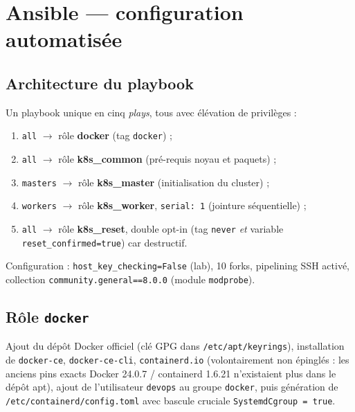 \documentclass[11pt,a4paper]{article}
\begin{document}
\section{Ansible --- configuration automatisée}

\subsection{Architecture du playbook}
Un playbook unique en cinq \emph{plays}, tous avec élévation de privilèges :

\begin{enumerate}[itemsep=1pt]
  \item \texttt{all} $\rightarrow$ rôle \textbf{docker} (tag \texttt{docker}) ;
  \item \texttt{all} $\rightarrow$ rôle \textbf{k8s\_common} (pré-requis noyau et paquets) ;
  \item \texttt{masters} $\rightarrow$ rôle \textbf{k8s\_master} (initialisation du cluster) ;
  \item \texttt{workers} $\rightarrow$ rôle \textbf{k8s\_worker}, \texttt{serial: 1} (jointure séquentielle) ;
  \item \texttt{all} $\rightarrow$ rôle \textbf{k8s\_reset}, double opt-in (tag \texttt{never} \emph{et} variable \texttt{reset\_confirmed=true}) car destructif.
\end{enumerate}

Configuration : \texttt{host\_key\_checking=False} (lab), 10 forks, pipelining SSH activé, collection \texttt{community.general==8.0.0} (module \texttt{modprobe}).

\subsection{Rôle \texttt{docker}}
Ajout du dépôt Docker officiel (clé GPG dans \texttt{/etc/apt/keyrings}), installation de \texttt{docker-ce}, \texttt{docker-ce-cli}, \texttt{containerd.io} (volontairement non épinglés : les anciens pins exacts Docker 24.0.7 / containerd 1.6.21 n'existaient plus dans le dépôt apt), ajout de l'utilisateur \texttt{devops} au groupe \texttt{docker}, puis génération de \texttt{/etc/containerd/config.toml} avec bascule cruciale \texttt{SystemdCgroup = true}.
\end{document}
